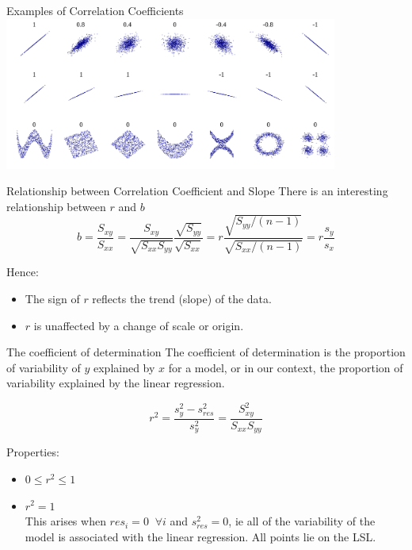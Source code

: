 \documentclass[t,xcolor=pdftex,dvipsnames,table]{beamer}
\begin{document}
\begin{frame}[fragile]{Examples of Correlation Coefficients}
\includegraphics[height=5cm]{../images/CorrelationChart.jpg}

\href{https://en.wikipedia.org/wiki/Pearson_product-moment_correlation_coefficient}{}
\end{frame} 

\begin{frame}[fragile]{Relationship between Correlation Coefficient and Slope}
There is an interesting relationship between $r$ and $b$
\[ b =  \frac{ S_{xy} }{ S_{xx}  }
= \frac{ S_{xy} }{\sqrt{ S_{xx} S_{yy}} }   \frac{ \sqrt{ S_{yy} } }{ \sqrt{ S_{xx} } }
= r \frac{ \sqrt{ S_{yy}/(n-1)} }{ \sqrt{ S_{xx}/(n-1) }  }
= r \frac{ s_{y}}{s_{x}} \]

Hence:
\begin{itemize}
\item 
The sign of $r$ reflects the trend (slope) of the data.
\item
$r$ is unaffected by a change of scale or origin.
\end{itemize}
\end{frame} 

\begin{frame}[fragile]{The coefficient of determination}
The coefficient of determination is the proportion of variability of $y$ explained by $x$ for a model, or in our context, the proportion of variability explained by the linear regression. 

\[ \boxed{  r^2 = \frac{s_{y}^2 - s_{res}^2}{s_{y}^2} = \frac{S_{xy}^2}{S_{xx} S_{yy}}  }\]

Properties:
\begin{itemize}
\item $0 \leq r^2 \leq 1$ \\

\item  $r^2=1$ \\
This arises when $res_i=0 \;\; \forall i$ and $s_{res}^2=0$, ie all of the variability of the model is associated with the linear regression.
All points lie on the LSL.
\end{itemize}
\end{frame} 
\end{document}
